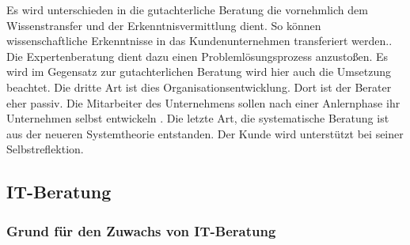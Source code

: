 Es wird unterschieden in die gutachterliche Beratung die \glqq vornehmlich dem Wissenstransfer und der Erkenntnisvermittlung \grqq dient. So können \glqq wissenschaftliche Erkenntnisse in das Kundenunternehmen transferiert werden.\grqq . Die Expertenberatung dient dazu einen \glqq Problemlösungsprozess \grqq anzustoßen. Es wird im Gegensatz zur gutachterlichen Beratung wird hier auch die Umsetzung beachtet. Die dritte Art ist dies Organisationsentwicklung. Dort ist der Berater \glqq eher passiv\grqq. Die Mitarbeiter des Unternehmens sollen nach einer Anlernphase ihr Unternehmen selbst \glqq entwickeln \grqq . Die letzte Art, die systematische Beratung ist aus der neueren Systemtheorie entstanden. Der Kunde wird unterstützt \glqq bei seiner Selbstreflektion\grqq.

\subsection{IT-Beratung}
	\subsubsection{Grund für den Zuwachs von IT-Beratung}
	
